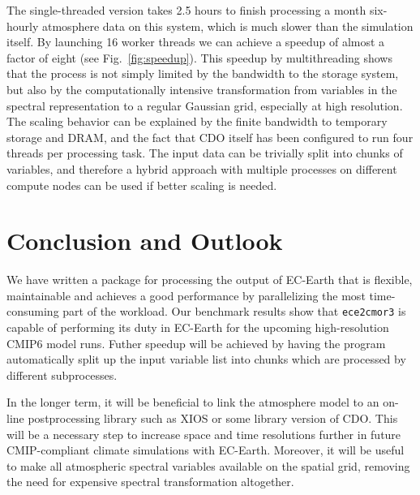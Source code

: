 \documentclass[procedia]{easychair}
\begin{document}
The single-threaded version takes 2.5 hours to finish processing a month 
six-hourly atmosphere data on this system, which is much slower than the 
simulation itself. By launching 16 worker threads we can achieve a speedup of 
almost a factor of eight (see Fig.~\ref{fig:speedup}). This speedup by 
multithreading shows that the process is not simply limited by the bandwidth to 
the storage system, but also by the computationally intensive 
transformation from variables in the spectral representation 
to a regular Gaussian grid, especially at high resolution. The scaling behavior 
can be explained by the finite bandwidth to temporary storage and DRAM, and 
the fact that CDO itself has been configured to run four threads per processing 
task. The input data can be trivially split into chunks of variables, and 
therefore a hybrid approach with multiple processes on different compute nodes 
can be used if better scaling is needed.


\section{Conclusion and Outlook}

We have written a package for processing the output of EC-Earth that is 
flexible, maintainable and achieves a good performance by parallelizing the 
most time-consuming part of the workload. Our benchmark results show that 
\texttt{ece2cmor3} is capable of performing its duty in EC-Earth for the 
upcoming high-resolution CMIP6 model runs. Futher speedup will be achieved by 
having the program automatically split up the input variable list into chunks 
which are processed by different subprocesses.

In the longer term, it will be beneficial to link the atmosphere model to an 
on-line postprocessing library such as XIOS or some library version of CDO. 
This will be a necessary step to increase space and time resolutions further in 
future CMIP-compliant climate simulations with EC-Earth. Moreover, it will be 
useful to make all atmospheric spectral variables available on the spatial 
grid, removing the need for expensive spectral transformation altogether.


%
\label{sect:bib}

%
%
%


\end{document}
